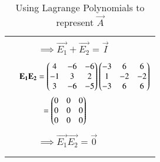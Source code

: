 \documentclass[journal,12pt]{IEEEtran}
\begin{document}
\begin{longtable}{|c|l|}
	&\\
	&$\qquad\implies\boxed{\vec{E_1}+\vec{E_2}=\vec{I}}$\\
	&\\
	&$\mathbf{E_1}\mathbf{E_2}=\begin{pmatrix}4&-6&-6\\-1&3&2\\3&-6&-5\end{pmatrix}\begin{pmatrix}-3&6&6\\1&-2&-2\\-3&6&6\end{pmatrix}$\\
	&$\qquad\quad=\begin{pmatrix}0&0&0\\0&0&0\\0&0&0\end{pmatrix}$\\
	&\\
	&$\qquad\implies\boxed{\vec{E_1}\vec{E_2}=\vec{0}}$\\
	&\\
	\hline
	\caption{Using Lagrange Polynomials to represent $\vec{A}$}
    \label{table:2}
\end{longtable}
\end{document}
